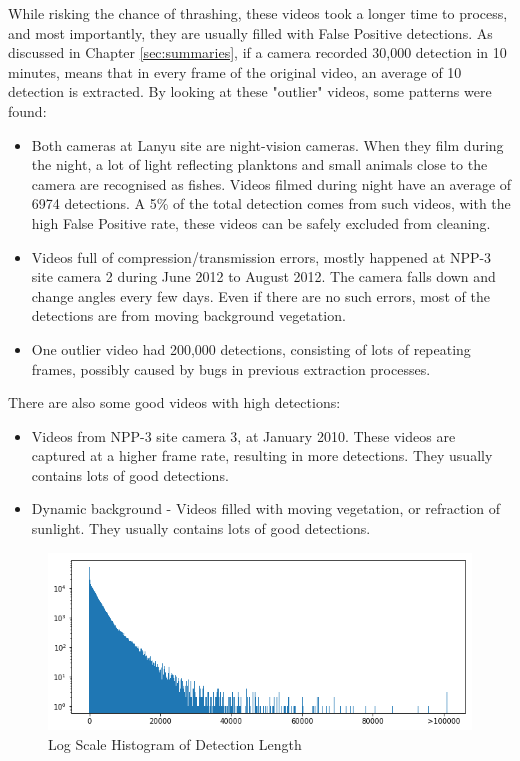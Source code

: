 \documentclass[bsc,logo,twoside,fullspacing,parskip]{infthesis}
\begin{document}
While risking the chance of thrashing, these videos took a longer time to process, and most importantly, they are usually filled with False Positive detections. As discussed in Chapter \ref{sec:summaries}, if a camera recorded 30,000 detection in 10 minutes, means that in every frame of the original video, an average of 10 detection is extracted. By looking at these "outlier" videos, some patterns were found:

\begin{itemize}
\item
Both cameras at Lanyu site are night-vision cameras. When they film during the night, a lot of light reflecting planktons and small animals close to the camera are recognised as fishes. Videos filmed during night have an average of 6974 detections. A 5\% of the total detection comes from such videos, with the high False Positive rate, these videos can be safely excluded from cleaning.
\item
Videos full of compression/transmission errors, mostly happened at NPP-3 site camera 2 during June 2012 to August 2012. The camera falls down and change angles every few days. Even if there are no such errors, most of the detections are from moving background vegetation.
\item
One outlier video had 200,000 detections, consisting of lots of repeating frames, possibly caused by bugs in previous extraction processes.
\end{itemize}
There are also some good videos with high detections: 
\begin{itemize}
\item
Videos from NPP-3 site camera 3, at January 2010. These videos are captured at a higher frame rate, resulting in more detections. They usually contains lots of good detections.
\item
Dynamic background - Videos filled with moving vegetation, or refraction of sunlight. They usually contains lots of good detections.
\end{itemize}

\begin{figure}[h]
\centering
    \includegraphics[scale=0.40]{graph/frame_distribution.png}
    \caption{Log Scale Histogram of Detection Length}
    \label{fig:vidlength}
\end{figure}
\end{document}
